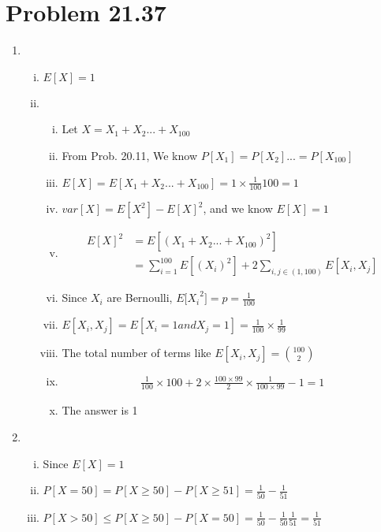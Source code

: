 \documentclass{article}
\def\math#1{$#1$}
\begin{document}
\section{Problem 21.37}
\begin{enumerate}
    \item \begin{enumerate}[i)]
        \item \math{E[X] = 1}
        \item \begin{enumerate}[i)]
            \item Let \math{X = X_1 + X_2 ... + X_{100}} 
            \item From Prob. 20.11, We know \math{P[X_1] = P[X_2] ... = P[X_{100}]}
            \item \math{E[X] = E[X_1 + X_2 ... + X_{100}] = 1 \times \frac{1}{100} 100 = 1}
            \item \math{var[X] = E[X^2] - E[X]^2}, and we know \math{E[X] = 1}
            \item \begin{equation}
                \begin{split}
                    E[X]^2 &= E[(X_1 + X_2 ... + X_{100})^2] \\
                    &= \sum^{100}_{i=1} E[(X_i)^2] + 2 \sum_{i, j \in (1,100)} E[X_i, X_j]
                \end{split}
            \end{equation}
            \item Since \math{X_i} are Bernoulli, \math{{E[X_i}^2] = p = \frac{1}{100}}
            \item \math{E[X_i, X_j] = E[X_i = 1 and X_j = 1] = \frac{1}{100} \times \frac{1}{99}}
            \item The total number of terms like \math{E[X_i, X_j] = \binom{100}{2}}
            \item \begin{equation}
                \begin{split}
                   \frac{1}{100} \times 100 + 2 \times \frac{100 \times 99}{2} \times \frac{1}{100\times99} - 1 = 1
                \end{split}
            \end{equation}
            \item The answer is 1
        \end{enumerate}
    \end{enumerate}
    \item \begin{enumerate}[i)]
        \item Since \math{E[X] = 1}
        \item \math{P[X = 50] = P[X \geq 50] - P[X \geq 51] = \frac{1}{50} - \frac{1}{51}}
        \item \math{P[X > 50] \leq P[X \geq 50] - P[X = 50] = \frac{1}{50} - \frac{1}{50}\frac{1}{51} = \frac{1}{51}}
    \end{enumerate}
\end{enumerate}
\end{document}
